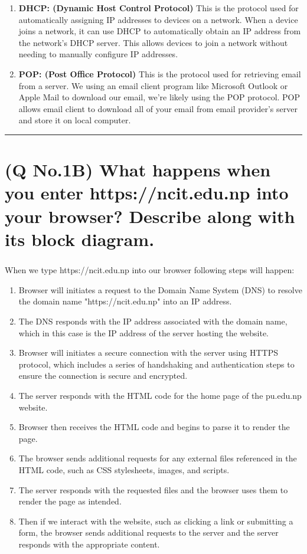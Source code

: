 \documentclass[11pt]{article}
\begin{document}
\begin{enumerate}
    \item \textbf{DHCP: (Dynamic Host Control Protocol)} This is the protocol used for automatically assigning IP addresses to devices on a network. When a device joins a network, it can use DHCP to automatically obtain an IP address from the network's DHCP server. This allows devices to join a network without needing to manually configure IP addresses.
    
    \item \textbf{POP: (Post Office Protocol)} This is the protocol used for retrieving email from a server. We using an email client program like Microsoft Outlook or Apple Mail to download our email, we're likely using the POP protocol. POP allows email client to download all of your email from email provider's server and store it on local computer.
\end{enumerate}



\noindent\rule{\linewidth}{0.4pt}
\section{(Q No.1B) What happens when you enter https://ncit.edu.np into your browser? Describe along with its block diagram.}
\subparagraph{}
When we type https://ncit.edu.np into our  browser following steps will happen:
\begin{enumerate}
    \item Browser will initiates a request to the Domain Name System (DNS) to resolve the domain name "https://ncit.edu.np" into an IP address.
    \item The DNS responds with the IP address associated with the domain name, which in this case is the IP address of the server hosting the website.
    \item Browser will initiates a secure connection with the server using HTTPS protocol, which includes a series of handshaking and authentication steps to ensure the connection is secure and encrypted.
    \item The server responds with the HTML code for the home page of the pu.edu.np website.
    \item Browser then receives the HTML code and begins to parse it to render the page.
    \item The browser sends additional requests for any external files referenced in the HTML code, such as CSS stylesheets, images, and scripts.
    \item The server responds with the requested files and the browser uses them to render the page as intended.
    \item Then if we interact with the website, such as clicking a link or submitting a form, the browser sends additional requests to the server and the server responds with the appropriate content.
\end{enumerate}
\end{document}
